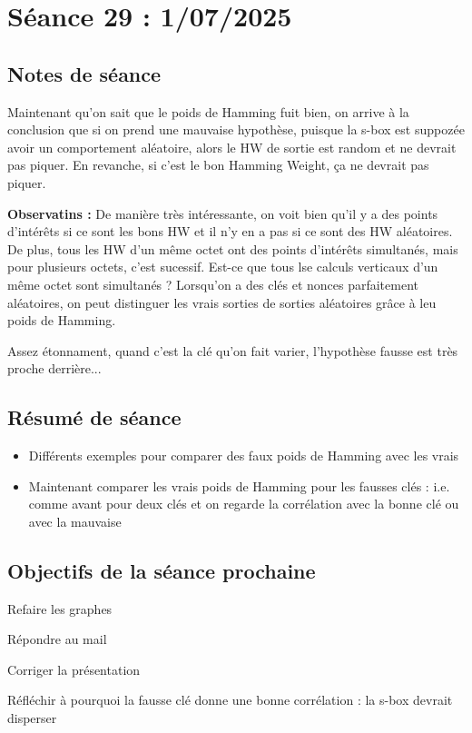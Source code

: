 \documentclass[12pt]{article}
\newcommand{\cmark}{\ding{51}}%
\newcommand{\done}{\rlap{$\square$}{\raisebox{2pt}{\large\hspace{1pt}\cmark}}%
	\hspace{-2.5pt}}
\begin{document}
	
	\section{Séance 29 : 1/07/2025}
	\subsection{Notes de séance}
	Maintenant qu'on sait que le poids de Hamming fuit bien, on arrive à la conclusion que si on prend une mauvaise hypothèse, puisque la s-box est suppozée avoir un comportement aléatoire, alors le HW de sortie est random et ne devrait pas piquer. En revanche, si c'est le bon Hamming Weight, ça ne devrait pas piquer.
	
	\noindent \textbf{Observatins :} De manière très intéressante, on voit bien qu'il y a des points d'intérêts si ce sont les bons HW et il n'y en a pas si ce sont des HW aléatoires. De plus, tous les HW d'un même octet ont des points d'intérêts simultanés, mais pour plusieurs octets, c'est sucessif. Est-ce que tous lse calculs verticaux d'un même octet sont simultanés ? Lorsqu'on a des clés et nonces parfaitement aléatoires, on peut distinguer les vrais sorties de sorties aléatoires grâce à leu poids de Hamming.
	
	\noindent Assez étonnament, quand c'est la clé qu'on fait varier, l'hypothèse fausse est très proche derrière...
	
	\subsection{Résumé de séance}
	\begin{itemize}
		\item Différents exemples pour comparer des faux poids de Hamming avec les vrais
		\item Maintenant comparer les vrais poids de Hamming pour les fausses clés : i.e. comme avant pour deux clés et on regarde la corrélation avec la bonne clé ou avec la mauvaise
	\end{itemize}
	
	\subsection{Objectifs de la séance prochaine}
	\begin{todolist}
		\item[\done] Refaire les graphes
		\item[\done] Répondre au mail
		\item Corriger la présentation
		\item[\done] Réfléchir à pourquoi la fausse clé donne une bonne corrélation : la s-box devrait disperser
	\end{todolist}
	
\end{document}
